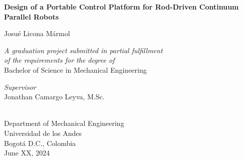 \begin{titlepage}
    \begin{spacing}{1}
    \hypertarget{titlepage}{} %
    \begin{center}
        \vspace*{0.5cm}

        \LARGE
        \textbf{Design of a Portable Control Platform for Rod-Driven Continuum Parallel Robots}

        \vspace{2cm}
        \Large
        Josué Licona Mármol

        \large
        \vspace{1.5cm}
        \textit{A graduation project submitted in partial fulfillment \\
        of the requirements for the degree of} \\
        \vspace{0.5cm}
        Bachelor of Science in Mechanical Engineering

        \vspace{1.5cm}
        \textit{Supervisor} \\
        Jonathan Camargo Leyva, M.Sc.

        \vspace{1cm}
        \vspace{1cm}
        \\
        Department of Mechanical Engineering\\
        Universidad de los Andes\\
        Bogotá D.C., Colombia\\
        June XX, 2024
    \end{center}
    \end{spacing}
\end{titlepage}

\normalsize